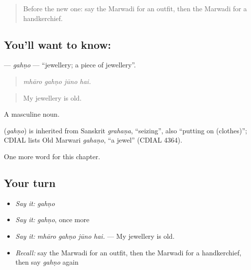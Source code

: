 \label{lesson:MW-C190-gahno}



\begin{quote}
Before the new one: say the Marwadi for an outfit, then the Marwadi for a handkerchief.
\end{quote}

\subsection*{You'll want to know: }
\textbf{} — \emph{gahṇo} — \textquotedblleft{}jewellery; a piece of jewellery\textquotedblright{}.

\begin{quote}
   
\end{quote}

\begin{quote}
\emph{mhāro gahṇo jūno hai.}
\end{quote}

\begin{quote}
My jewellery is old.
\end{quote}

A masculine noun.

\begin{cousinweb}
\textbf{} (\emph{gahṇo}) is inherited from Sanskrit \emph{grahaṇa}, \textquotedblleft{}seizing\textquotedblright{}, also \textquotedblleft{}putting on (clothes)\textquotedblright{}; CDIAL lists Old Marwari \emph{gahaṇo}, \textquotedblleft{}a jewel\textquotedblright{} (CDIAL 4364).
\end{cousinweb}

\begin{grammarlens}[title={What you've built}]
One more word for this chapter.
\end{grammarlens}

\subsection*{Your turn}
\begin{itemize}
\raggedright
  \item \emph{Say it:} \emph{gahṇo}
  \item \emph{Say it:} \emph{gahṇo}, once more
  \item \emph{Say it:} \emph{mhāro gahṇo jūno hai.} — My jewellery is old.
  \item \emph{Recall:} say the Marwadi for an outfit, then the Marwadi for a handkerchief, then say \emph{gahṇo} again
\end{itemize}

